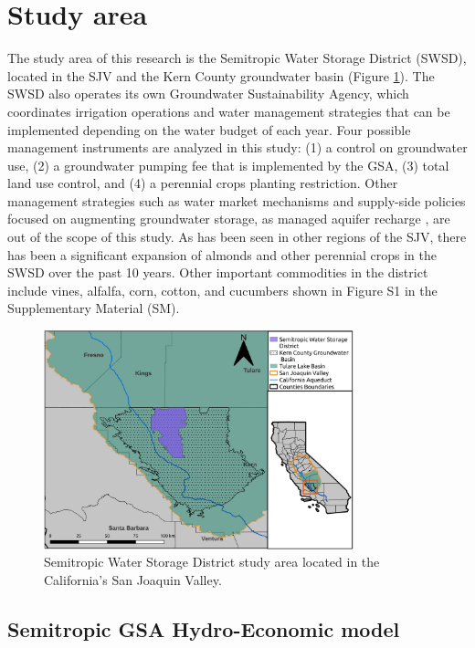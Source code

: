 \documentclass[a4paper,fleqn]{cas-sc}
\begin{document}
\section{Study area}

The study area of this research is the Semitropic Water Storage District (SWSD), located in the SJV and the Kern County groundwater basin (Figure \ref{fig:2}). The SWSD also operates its own Groundwater Sustainability Agency, which  coordinates irrigation operations and water management strategies that can be implemented depending on the water budget of each year. Four possible management instruments are analyzed in this study: (1) a control on groundwater use, (2) a groundwater pumping fee that is implemented by the GSA, (3) total land use control, and (4) a perennial crops planting restriction. Other management strategies such as water market mechanisms and supply-side policies focused on augmenting groundwater storage, as managed aquifer recharge \citep{ulibarri_assessing_2021}, are out of the scope of this study. As has been seen in other regions of the SJV, there has been a significant expansion of almonds and other perennial crops in the SWSD over the past 10 years. Other important commodities in the district include vines, alfalfa, corn, cotton, and cucumbers shown in Figure S1 in the Supplementary Material (SM). 
  

\begin{figure}[ht]
    \centering
    \includegraphics[width=0.8\textwidth,center]{Map_Semitropic.jpg}
    \caption{Semitropic Water Storage District study area located in the California’s San Joaquin Valley.}
    \label{fig:2}
\end{figure}

\subsection{Semitropic GSA Hydro-Economic model}
\end{document}
